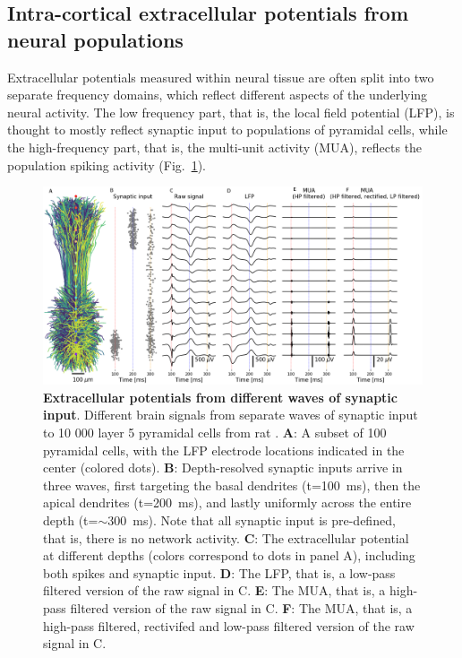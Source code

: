\documentclass[preprint,11pt,authoryear]{elsarticle}
\begin{document}
\begin{itemize}
\begin{itemize}
\section{Intra-cortical extracellular potentials from neural populations}
Extracellular potentials measured within neural tissue are often split into two separate frequency domains, which reflect different aspects of the underlying neural activity. 
The low frequency part, that is, the local field potential (LFP), is thought to mostly reflect synaptic input to populations of pyramidal cells, while the high-frequency part, that is, the multi-unit activity (MUA), reflects the population spiking activity (Fig.~\ref{fig:LFP_MUA}).

\begin{figure}[!ht]
\begin{center}
\includegraphics[width=1\textwidth]{population_LFP_MUA.png}
\end{center}
\caption{\textbf{Extracellular potentials from different waves of synaptic input}. Different brain signals from separate waves of synaptic input to 10 000 layer 5 pyramidal cells from rat \citep{Hay2011}.
{\bf A}: A subset of 100 pyramidal cells, with the LFP electrode locations indicated in the center (colored dots).
{\bf B}: Depth-resolved synaptic inputs arrive in three waves, first targeting the basal dendrites (t=100~ms), then the apical dendrites (t=200~ms), and lastly uniformly across the entire depth (t=$\sim$300~ms). Note that all synaptic input is pre-defined, that is, there is no network activity.
{\bf C}: The extracellular potential at different depths (colors correspond to dots in panel A), including both spikes and synaptic input.
{\bf D}: The LFP, that is, a low-pass filtered version of the raw signal in C.
{\bf E}: The MUA, that is, a high-pass filtered version of the raw signal in C.
{\bf F}: The MUA, that is, a high-pass filtered, rectivifed and low-pass filtered version of the raw signal in C.
}
\label{fig:LFP_MUA}
\end{figure}



\end{itemize}
\end{itemize}
\end{document}

